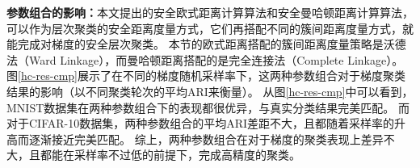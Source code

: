 \textbf{参数组合的影响：}本文提出的安全欧式距离计算算法和安全曼哈顿距离计算算法，可以作为层次聚类的安全距离度量方式，它们再搭配不同的簇间距离度量方式，就能完成对梯度的安全层次聚类。
本节的欧式距离搭配的簇间距离度量策略是沃德法（Ward Linkage），而曼哈顿距离搭配的是完全连接法（Complete Linkage）。
图\ref{hc-res-cmp}展示了在不同的梯度随机采样率下，这两种参数组合对于梯度聚类结果的影响（以不同聚类轮次的平均ARI来衡量）。
从图\ref{hc-res-cmp}中可以看到，MNIST数据集在两种参数组合下的表现都很优异，与真实分类结果完美匹配。
而对于CIFAR-10数据集，两种参数组合的平均ARI差距不大，且都随着采样率的升高而逐渐接近完美匹配。
综上，两种参数组合在对于梯度的聚类表现上差异不大，且都能在采样率不过低的前提下，完成高精度的聚类。

{\wuhao
\begin{figure}[htb]
	\centering
	\qquad
\end{figure}}
